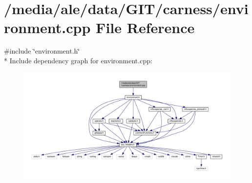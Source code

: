 \hypertarget{a00071}{\section{/media/ale/data/\-G\-I\-T/carness/environment.cpp File Reference}
\label{a00071}
}
{\ttfamily \#include \char`\"{}environment.\-h\char`\"{}}\\*
Include dependency graph for environment.\-cpp\-:\nopagebreak
\begin{figure}[H]
\begin{center}
\leavevmode
\includegraphics[width=350pt]{a00139}
\end{center}
\end{figure}
